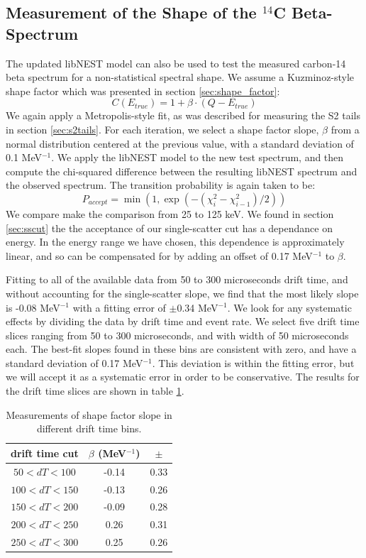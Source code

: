 \subsection{Measurement of the Shape of the $^{14}$C Beta-Spectrum}\label{sec:shape_fit}
The updated libNEST model can also be used to test the measured carbon-14 beta spectrum for a non-statistical spectral shape. We assume a Kuzminoz-style shape factor\cite{C14_Kuzminov} which was presented in section \ref{sec:shape_factor}:
\begin{equation}
C(E_{true})=1+\beta\cdot(Q-E_{true})
\end{equation}
We again apply a Metropolis-style fit, as was described for measuring the S2 tails in section \ref{sec:s2tails}. For each iteration, we select a shape factor slope, $\beta$ from a normal distribution centered at the previous value, with a standard deviation of 0.1 MeV$^{-1}$. We apply the libNEST model to the new test spectrum, and then compute the chi-squared difference between the resulting libNEST spectrum and the observed spectrum. The transition probability is again taken to be:
\begin{equation}
P_{accept}=\min(1,\exp(-(\chi_i^2-\chi_{i-1}^2)/2))
\end{equation}
We compare make the comparison from 25 to 125 keV. We found in section \ref{sec:sscut} the the acceptance of our single-scatter cut has a dependance on energy. In the energy range we have chosen, this dependence is approximately linear, and so can be compensated for by adding an offset of 0.17 MeV$^{-1}$ to $\beta$.

Fitting to all of the available data from 50 to 300 microseconds drift time, and without accounting for the single-scatter slope, we find that the most likely slope is -0.08 MeV$^{-1}$ with a fitting error of $\pm$0.34 MeV$^{-1}$. We look for any systematic effects by dividing the data by drift time and event rate. We select five drift time slices ranging from 50 to 300 microseconds, and with width of 50 microseconds each. The best-fit slopes found in these bins are consistent with zero, and have a standard deviation of 0.17 MeV$^{-1}$. This deviation is within the fitting error, but we will accept it as a systematic error in order to be conservative. The results for the drift time slices are shown in table \ref{tab:shape_dt}. 
\begin{table}
\centering
\begin{tabular}{c | c | c}
\hline
drift time cut & $\beta$ (MeV$^{-1}$) & $\pm$\\
\hline\hline
$50<dT<100$ & -0.14 & 0.33\\
$100<dT<150$ & -0.13 & 0.26\\
$150<dT<200$ & -0.09 & 0.28\\
$200<dT<250$ & 0.26 & 0.31\\
$250<dT<300$ & 0.25 & 0.26\\
\hline
\end{tabular}
\caption{Measurements of shape factor slope in different drift time bins.}
\label{tab:shape_dt}
\end{table}


